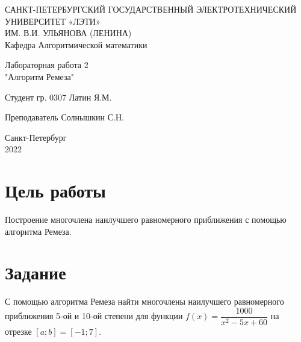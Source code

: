 \documentclass{article}
\begin{document}
	
	\begin{titlepage}
		
		\begin{center}
			САНКТ-ПЕТЕРБУРГСКИЙ ГОСУДАРСТВЕННЫЙ ЭЛЕКТРОТЕХНИЧЕСКИЙ УНИВЕРСИТЕТ «ЛЭТИ» \\ИМ. В.И. УЛЬЯНОВА (ЛЕНИНА)\\
			\vspace{0.1cm}
			Кафедра Алгоритмической математики\\
			
			
			
		\end{center}
		
		\vspace{5cm}
		\begin{center}
			\begin{large}
				Лабораторная работа 2 \\
				"Алгоритм Ремеза"
			\end{large}
		\end{center}
		
		\vspace{5cm}
		
		\hspace{5cm} Студент гр.  0307 \hrulefill Латин Я.М.
		
		\vspace{0.5cm}
		\hspace{5cm} Преподаватель \hrulefill  Солнышкин С.Н.\\
		
		
		\vfill
		\begin{center}
			Санкт-Петербург\\
			2022
		\end{center}
		
		
	\end{titlepage}
	
	
	\newpage
	\tableofcontents
	\newpage
	\section{Цель работы}
	Построение многочлена наилучшего равномерного приближения с помощью алгоритма Ремеза.
	\section{Задание}
	С помощью алгоритма Ремеза найти многочлены наилучшего равномерного приближения 5-ой и 10-ой степени для функции $ f(x)=\dfrac{1000}{x^2-5x+60} $ на отрезке $[a;b]=[-1;7]$.\\
	
\end{document}
